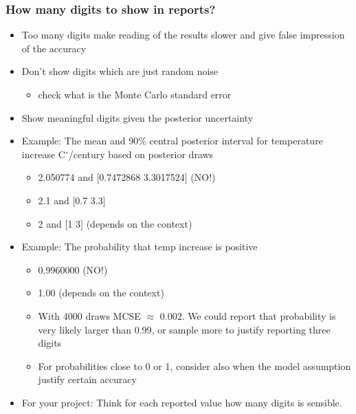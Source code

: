 \documentclass[10pt]{beamer}
\begin{document}
\begin{frame}

\frametitle{How many digits to show in reports?}


  \begin{itemize}
  \item Too many digits make reading of the results slower and give
    false impression of the accuracy
  \item<2-> Don't show digits which are just random noise
    \begin{itemize}
    \item check what is the Monte Carlo standard error
    \end{itemize}
  \item<3-> Show meaningful digits given the posterior uncertainty
  \item<4-> Example: The mean and 90\% central posterior interval for temperature
     increase C$^\circ$/century based on posterior draws
     \begin{itemize}
     \item<5-> {\color{red} 2.050774 and $[$0.7472868 3.3017524$]$} (NO!)
     \item<6-> {\color{uured} 2.1 and $[$0.7 3.3$]$}
    \item<7-> {\color{uured} 2 and $[$1 3$]$} (depends on the context)
     \end{itemize}
   \item<8-> Example: The probability that temp increase is
     positive
     \begin{itemize}
     \item<9-> {\color{red} 0.9960000} (NO!)
     \item<10-> {\color{uured} 1.00} (depends on the context)
     \item<11-> With 4000 draws MCSE $\approx$ 0.002. We could report
       that probability is {\color{uured} very likely larger than 0.99}, or sample
       more to justify reporting three digits
     \item<12-> For probabilities close to 0 or 1, consider also when
       the model assumption justify certain accuracy
     \end{itemize}
   \item<12-> For your project: Think for each reported value how many digits is sensible.
  \end{itemize}

\end{frame}
\end{document}
